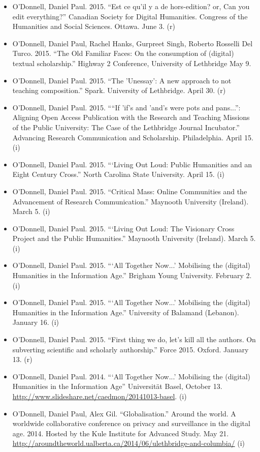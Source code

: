 \documentclass[12pt]{article}
\begin{document}
\begin{itemize}
  \item O'Donnell, Daniel Paul. 2015. “Est ce qu’il y a de hors-edition? or, Can you edit everything?” Canadian Society for Digital Humanities. Congress of the Humanities and Social Sciences. Ottawa. June 3. (r)
  \item O'Donnell, Daniel Paul, Rachel Hanks\*, Gurpreet Singh\*, Roberto Rosselli Del Turco. 2015. “The Old Familiar Faces: On the consumption of (digital) textual scholarship.” Highway 2 Conference, University of Lethbridge May 9.
  \item O’Donnell, Daniel Paul. 2015. “The 'Unessay': A new approach to not teaching composition.” Spark. University of Lethbridge. April 30. (r)
  \item O’Donnell, Daniel Paul. 2015. ““If 'if's and 'and's were pots and pans...”: Aligning Open Access Publication with the Research and Teaching Missions of the Public University: The Case of the Lethbridge Journal Incubator.” Advancing Research Communication and Scholarship. Philadelphia. April 15. (i)
  \item O’Donnell, Daniel Paul. 2015. “‘Living Out Loud: Public Humanities and an Eight Century Cross.” North Carolina State University. April 15. (i)
  \item O’Donnell, Daniel Paul. 2015. “Critical Mass: Online Communities and the Advancement of Research Communication.” Maynooth University (Ireland). March 5. (i)
  \item O’Donnell, Daniel Paul. 2015. “‘Living Out Loud: The Visionary Cross Project and the Public Humanities.” Maynooth University (Ireland). March 5. (i)
  \item O’Donnell, Daniel Paul. 2015. “‘All Together Now...’ Mobilising the (digital) Humanities in the Information Age.” Brigham Young University. February 2. (i)
  \item O’Donnell, Daniel Paul. 2015. “‘All Together Now...’ Mobilising the (digital) Humanities in the Information Age.” University of Balamand (Lebanon). January 16. (i)
  \item O’Donnell, Daniel Paul. 2015. “First thing we do, let's kill all the authors. On subverting scientific and scholarly authorship.” Force 2015. Oxford. January 13. (r)
  \item O’Donnell, Daniel Paul. 2014. “‘All Together Now...’ Mobilising the (digital) Humanities in the Information Age” Universität Basel, October 13. \url{http://www.slideshare.net/caedmon/20141013-basel}. (i)
  \item O'Donnell, Daniel Paul, Alex Gil. “Globalisation.” Around the world. A worldwide collaborative conference on privacy and surveillance in the digital age. 2014. Hosted by the Kule Institute for Advanced Study. May 21. \url{http://aroundtheworld.ualberta.ca/2014/06/ulethbridge-and-columbia/} (i)

\end{itemize}
\end{document}
